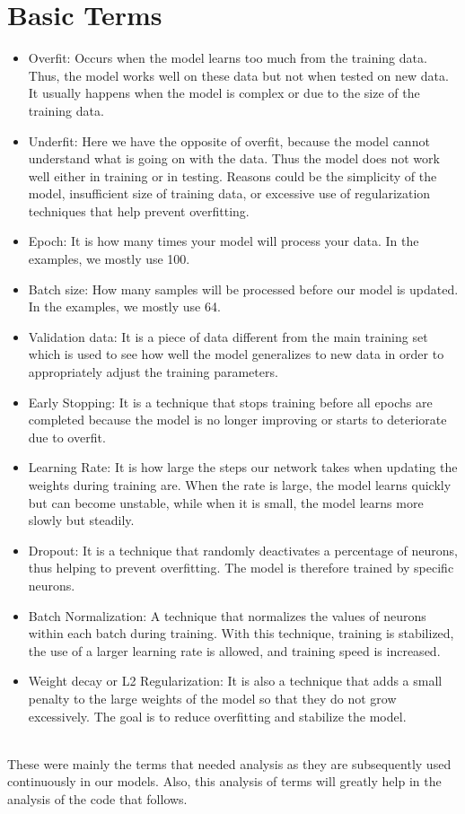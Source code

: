 \documentclass[11pt, letterpaper]{article}
\begin{document}
\newpage

\section*{Basic Terms}
\begin{itemize}
    \item Overfit: Occurs when the model learns too much from the training data. Thus, the model works well on these data but not when tested on new data. It usually happens when the model is complex or due to the size of the training data.
    \item Underfit: Here we have the opposite of overfit, because the model cannot understand what is going on with the data. Thus the model does not work well either in training or in testing. Reasons could be the simplicity of the model, insufficient size of training data, or excessive use of regularization techniques that help prevent overfitting.
    \item Epoch: It is how many times your model will process your data. In the examples, we mostly use 100.
    \item Batch size: How many samples will be processed before our model is updated. In the examples, we mostly use 64.
    \item Validation data: It is a piece of data different from the main training set which is used to see how well the model generalizes to new data in order to appropriately adjust the training parameters.
    \item Early Stopping: It is a technique that stops training before all epochs are completed because the model is no longer improving or starts to deteriorate due to overfit.
    \item Learning Rate: It is how large the steps our network takes when updating the weights during training are. When the rate is large, the model learns quickly but can become unstable, while when it is small, the model learns more slowly but steadily.
    \item Dropout: It is a technique that randomly deactivates a percentage of neurons, thus helping to prevent overfitting. The model is therefore trained by specific neurons.
    \item Batch Normalization: A technique that normalizes the values of neurons within each batch during training. With this technique, training is stabilized, the use of a larger learning rate is allowed, and training speed is increased.
    \item Weight decay or L2 Regularization: It is also a technique that adds a small penalty to the large weights of the model so that they do not grow excessively. The goal is to reduce overfitting and stabilize the model. \\ \\
\end{itemize}
These were mainly the terms that needed analysis as they are subsequently used continuously in our models. Also, this analysis of terms will greatly help in the analysis of the code that follows.
\end{document}
